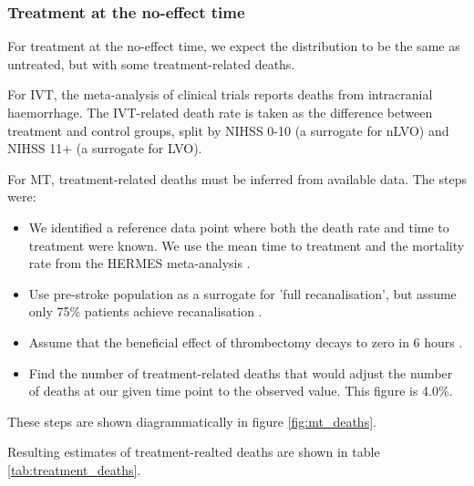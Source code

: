 \subsubsection{Treatment at the no-effect time}

For treatment at the no-effect time, we expect the distribution to be the same as untreated, but with some treatment-related deaths.

For IVT, the meta-analysis of clinical trials \cite{emberson_effect_2014} reports deaths from intracranial haemorrhage. The IVT-related death rate is taken as the difference between treatment and control groups, split by NIHSS 0-10 (a surrogate for nLVO) and NIHSS 11+ (a surrogate for LVO).

For MT, treatment-related deaths must be inferred from available data. The steps were:

\begin{itemize}
    \item We identified a reference data point where both the death rate and time to treatment were known. We use the mean time to treatment and the mortality rate from the HERMES meta-analysis \cite{goyal_endovascular_2016}.
    \item Use pre-stroke population as a surrogate for 'full recanalisation', but assume only 75\% patients achieve recanalisation \cite{hui_efficacy_2020}.
    \item Assume that the beneficial effect of thrombectomy decays to zero in 6 hours \cite{fransen_time_2016}.
    \item Find the number of treatment-related deaths that would adjust the number of deaths at our given time point to the observed value. This figure is 4.0\%.
\end{itemize}

These steps are shown diagrammatically in figure \ref{fig:mt_deaths}.

Resulting estimates of treatment-realted deaths are shown in table \ref{tab:treatment_deaths}.  

